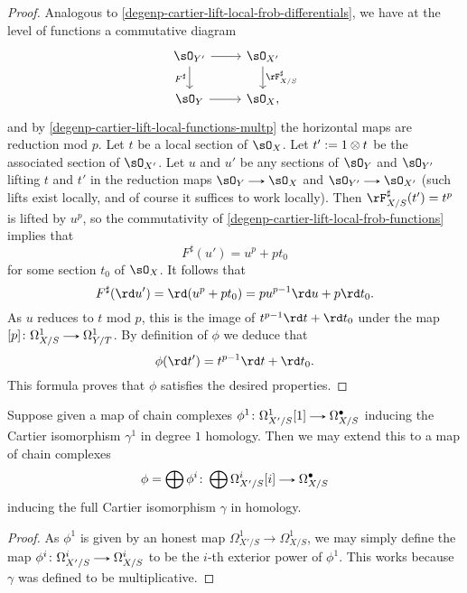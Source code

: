 \begin{proposition}
\begin{proof}
    Analogous to \cref{degenp-cartier-lift-local-frob-differentials}, we have at the level of functions a commutative diagram
    \begin{equation}
      \label{degenp-cartier-lift-local-frob-functions}
      \begin{tikzcd}
        \sO_{Y'} \ar[r] \ar[d, "F^\sharp", swap] &
        \sO_{X'} \ar[d, "\rF_{X/S}^\sharp"] \\
        \sO_{Y} \ar[r]  &
        \sO_{X},
      \end{tikzcd}
    \end{equation}
    and by \cref{degenp-cartier-lift-local-functions-multp} the horizontal maps are reduction mod $p$. Let $t$ be a local section of $\sO_X$. Let $t' \mathrel{:=} 1 \otimes t$ be the associated section of $\sO_{X'}$. Let $u$ and $u'$ be any sections of $\sO_Y$ and $\sO_{Y'}$ lifting $t$ and $t'$ in the reduction maps $\sO_{Y} \to \sO_{X}$ and $\sO_{Y'} \to \sO_{X'}$ (such lifts exist locally, and of course it suffices to work locally). Then $\rF^\sharp_{X/S}(t') = t^p$ is lifted by $u^p$, so the commutativity of \cref{degenp-cartier-lift-local-frob-functions} implies that
    \[
      F^\sharp(u') = u^p + pt_0
    \]
    for some section $t_0$ of $\sO_X$. It follows that
    \[
      F^\sharp(\rd u') = \rd(u^p + pt_0) = pu^{p-1}\rd u + p\rd t_0.
    \]
    As $u$ reduces to $t$ mod $p$, this is the image of $t^{p-1} \rd t + \rd t_0$ under the map $[p] \c \Omega^1_{X/S} \to \Omega^1_{Y/T}$. By definition of $\phi$ we deduce that
    \[
      \phi(\rd t') = t^{p-1} \rd t + \rd t_0.
    \]
    This formula proves that $\phi$ satisfies the desired properties.
  \end{proof}
\end{proposition}

\begin{proposition}
  \label{degenp-cartier-lift-honest-multiplicative}
  Suppose given a map of chain complexes $\phi^1 \c \Omega_{X'/S}^1[1] \to \Omega_{X/S}^\bullet$ inducing the Cartier isomorphism $\gamma^1$ in degree $1$ homology. Then we may extend this to a map of chain complexes
  \[
    \phi = \bigoplus \phi^i \c \bigoplus \Omega^i_{X'/S}[i] \to \Omega_{X/S}^\bullet
  \]
  inducing the full Cartier isomorphism $\gamma$ in homology.

  \begin{proof}
    As $\phi^1$ is given by an honest map $\Omega^1_{X'/S} \to \Omega^1_{X/S}$, we may simply define the map $\phi^i \c \Omega^i_{X'/S} \to \Omega^i_{X/S}$ to be the $i$-th exterior power of $\phi^1$. This works because $\gamma$ was defined to be multiplicative.
  \end{proof}
\end{proposition}

